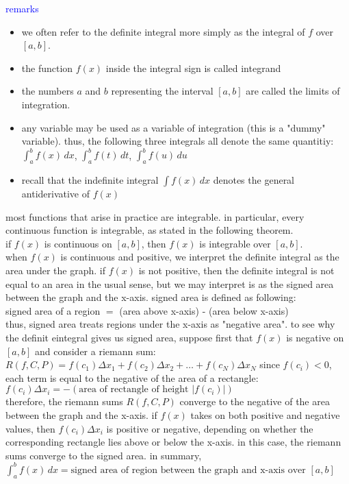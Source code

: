 \documentclass{article}
\begin{document}
\textcolor{blue}{remarks}
	\begin{itemize}
		\item we often refer to the definite integral more simply as the integral of $f$ over $[a, b]$.
		\item the function $f(x)$ inside the integral sign is called integrand
		\item the numbers $a$ and $b$ representing the interval $[a, b]$ are called the limits of integration.
		\item any variable may be used as a variable of integration (this is a "dummy" variable). thus, the following three integrals all denote the same quantitiy: $\int_{a}^{b}f(x)\,dx$, $\int_{a}^{b}f(t)\,dt$, $\int_{a}^{b}f(u)\,du$  
		\item recall that the indefinite integral $\int f(x)\, dx$ denotes the general antiderivative of $f(x)$
	\end{itemize}
most functions that arise in practice are integrable. in particular, every continuous function is integrable, as stated in the following theorem.\\
if $f(x)$ is continuous on $[a, b]$, then $f(x)$ is integrable over $[a, b]$.\\

when $f(x)$ is continuous and positive, we interpret the definite integral as the area under the graph. if $f(x)$ is not positive, then the definite integral is not equal to an area in the usual sense, but we may interpret is as the signed area between the graph and the x-axis. signed area is defined as following:\\
signed area of a region $=$ (area above x-axis) - (area below x-axis)\\

thus, signed area treats regions under the x-axis as "negative area". to see why the definit eintegral gives us signed area, suppose first that $f(x)$ is negative on $[a, b]$ and consider a riemann sum: $R(f, C, P) = f(c_1)\Delta x_1 + f(c_2)\Delta x_2 + \ldots + f(c_N)\Delta x_N$ since $f(c_i) < 0$, each term is equal to the negative of the area of a rectangle: $f(c_i)\Delta x_i = -(\text{area of rectangle of height }\lvert f(c_i)\rvert)$\\

therefore, the riemann sums $R(f, C, P)$ converge to the negative of the area between the graph and the x-axis. if $f(x)$ takes on both positive and negative values, then $f(c_i)\Delta x_i$ is positive or negative, depending on whether the corresponding rectangle lies above or below the x-axis. in this case, the riemann sums converge to the signed area. in summary,\\
$\int_{a}^{b}f(x)\, dx = \text{signed area of region between the graph and x-axis over } [a, b]$\\
\end{document}
